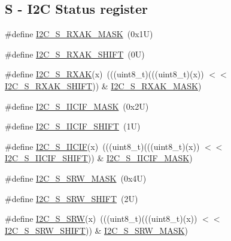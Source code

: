\subsection*{S -\/ I2C Status register}
\begin{DoxyCompactItemize}
\item 
\#define \mbox{\hyperlink{group___i2_c___register___masks_gad24c329c5eb1d51b4d1bdf637f0071d3}{I2\+C\+\_\+\+S\+\_\+\+R\+X\+A\+K\+\_\+\+M\+A\+SK}}~(0x1\+U)
\item 
\#define \mbox{\hyperlink{group___i2_c___register___masks_ga120dc0ebf2986dd160b9592ec711a177}{I2\+C\+\_\+\+S\+\_\+\+R\+X\+A\+K\+\_\+\+S\+H\+I\+FT}}~(0\+U)
\item 
\#define \mbox{\hyperlink{group___i2_c___register___masks_ga8aacd2266555789c7840411ebcc2fb42}{I2\+C\+\_\+\+S\+\_\+\+R\+X\+AK}}(x)~(((uint8\+\_\+t)(((uint8\+\_\+t)(x)) $<$$<$ \mbox{\hyperlink{group___i2_c___register___masks_ga120dc0ebf2986dd160b9592ec711a177}{I2\+C\+\_\+\+S\+\_\+\+R\+X\+A\+K\+\_\+\+S\+H\+I\+FT}})) \& \mbox{\hyperlink{group___i2_c___register___masks_gad24c329c5eb1d51b4d1bdf637f0071d3}{I2\+C\+\_\+\+S\+\_\+\+R\+X\+A\+K\+\_\+\+M\+A\+SK}})
\item 
\#define \mbox{\hyperlink{group___i2_c___register___masks_ga23f38878179bb0186dd2c64698417ec3}{I2\+C\+\_\+\+S\+\_\+\+I\+I\+C\+I\+F\+\_\+\+M\+A\+SK}}~(0x2\+U)
\item 
\#define \mbox{\hyperlink{group___i2_c___register___masks_ga36fe15d9bbf77410ab19317e78d2d5ea}{I2\+C\+\_\+\+S\+\_\+\+I\+I\+C\+I\+F\+\_\+\+S\+H\+I\+FT}}~(1\+U)
\item 
\#define \mbox{\hyperlink{group___i2_c___register___masks_ga1a977ca499ff9150e08cbd671628a2c2}{I2\+C\+\_\+\+S\+\_\+\+I\+I\+C\+IF}}(x)~(((uint8\+\_\+t)(((uint8\+\_\+t)(x)) $<$$<$ \mbox{\hyperlink{group___i2_c___register___masks_ga36fe15d9bbf77410ab19317e78d2d5ea}{I2\+C\+\_\+\+S\+\_\+\+I\+I\+C\+I\+F\+\_\+\+S\+H\+I\+FT}})) \& \mbox{\hyperlink{group___i2_c___register___masks_ga23f38878179bb0186dd2c64698417ec3}{I2\+C\+\_\+\+S\+\_\+\+I\+I\+C\+I\+F\+\_\+\+M\+A\+SK}})
\item 
\#define \mbox{\hyperlink{group___i2_c___register___masks_gaf802822114be53d791101a05f50af5a3}{I2\+C\+\_\+\+S\+\_\+\+S\+R\+W\+\_\+\+M\+A\+SK}}~(0x4\+U)
\item 
\#define \mbox{\hyperlink{group___i2_c___register___masks_gae9ff7b0c74aeb1c906bfe71fa1620fae}{I2\+C\+\_\+\+S\+\_\+\+S\+R\+W\+\_\+\+S\+H\+I\+FT}}~(2\+U)
\item 
\#define \mbox{\hyperlink{group___i2_c___register___masks_ga3c251f26dc02eecdb65829e45b9830d1}{I2\+C\+\_\+\+S\+\_\+\+S\+RW}}(x)~(((uint8\+\_\+t)(((uint8\+\_\+t)(x)) $<$$<$ \mbox{\hyperlink{group___i2_c___register___masks_gae9ff7b0c74aeb1c906bfe71fa1620fae}{I2\+C\+\_\+\+S\+\_\+\+S\+R\+W\+\_\+\+S\+H\+I\+FT}})) \& \mbox{\hyperlink{group___i2_c___register___masks_gaf802822114be53d791101a05f50af5a3}{I2\+C\+\_\+\+S\+\_\+\+S\+R\+W\+\_\+\+M\+A\+SK}})
$$
\end{DoxyCompactItemize}
